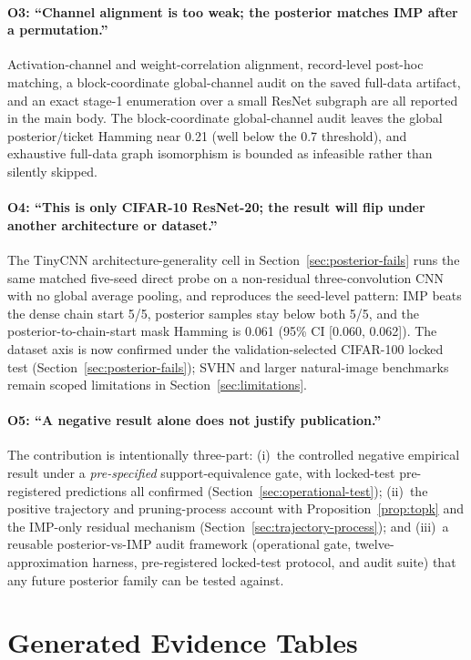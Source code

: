 \documentclass{article}
\newif\iflotteryneurips
\begin{document}
  \paragraph{O3: ``Channel alignment is too weak; the posterior matches
  IMP after a permutation.''}
  Activation-channel and weight-correlation alignment, record-level
  post-hoc matching, a block-coordinate global-channel audit on the
  saved full-data artifact, and an exact stage-1 enumeration over a small
  ResNet subgraph are all reported in the main body. The
  block-coordinate global-channel audit leaves the global posterior/ticket
  Hamming near 0.21 (well below the 0.7 threshold), and exhaustive full-data
  graph isomorphism is bounded as infeasible rather than silently skipped.

  \paragraph{O4: ``This is only CIFAR-10 ResNet-20; the result will flip
  under another architecture or dataset.''}
  The TinyCNN architecture-generality cell in
  Section~\ref{sec:posterior-fails} runs the same matched five-seed direct
  probe on a non-residual three-convolution CNN with no global average
  pooling, and reproduces the seed-level pattern: IMP beats the dense chain
  start 5/5, posterior samples stay below both 5/5, and the
  posterior-to-chain-start mask Hamming is 0.061 (95\% CI [0.060, 0.062]).
  The dataset axis is now confirmed under the validation-selected
  CIFAR-100 locked test (Section~\ref{sec:posterior-fails}); SVHN and
  larger natural-image benchmarks remain scoped limitations in
  Section~\ref{sec:limitations}.

  \paragraph{O5: ``A negative result alone does not justify publication.''}
  The contribution is intentionally three-part:
  (i)~the controlled negative empirical result under a
  \emph{pre-specified} support-equivalence gate, with locked-test
  pre-registered predictions all confirmed
  (Section~\ref{sec:operational-test});
  (ii)~the positive trajectory and pruning-process account with
  Proposition~\ref{prop:topk} and the IMP-only residual mechanism
  (Section~\ref{sec:trajectory-process}); and
  (iii)~a reusable posterior-vs-IMP audit framework (operational gate,
  twelve-approximation harness, pre-registered locked-test protocol, and
  audit suite) that any future posterior family can be tested against.

  \section{Generated Evidence Tables}

  
\fi

\iflotteryneurips
  \clearpage
  
\fi
\end{document}
